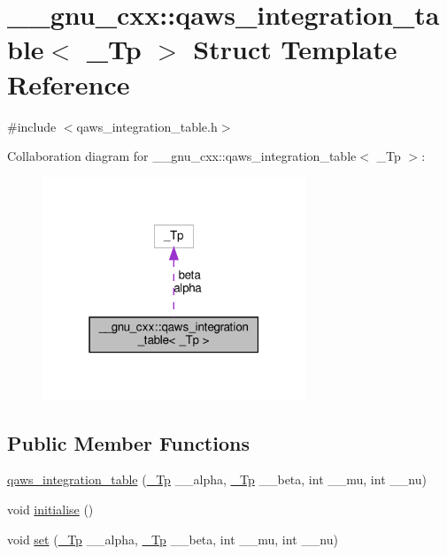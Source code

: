 \hypertarget{struct____gnu__cxx_1_1qaws__integration__table}{}\section{\+\_\+\+\_\+gnu\+\_\+cxx\+:\+:qaws\+\_\+integration\+\_\+table$<$ \+\_\+\+Tp $>$ Struct Template Reference}
\label{struct____gnu__cxx_1_1qaws__integration__table}


{\ttfamily \#include $<$qaws\+\_\+integration\+\_\+table.\+h$>$}



Collaboration diagram for \+\_\+\+\_\+gnu\+\_\+cxx\+:\+:qaws\+\_\+integration\+\_\+table$<$ \+\_\+\+Tp $>$\+:
\nopagebreak
\begin{figure}[H]
\begin{center}
\leavevmode
\includegraphics[width=223pt]{struct____gnu__cxx_1_1qaws__integration__table__coll__graph}
\end{center}
\end{figure}
\subsection*{Public Member Functions}
\begin{DoxyCompactItemize}
\item 
\hyperlink{struct____gnu__cxx_1_1qaws__integration__table_a2fc28f96d3219257c427f50bb6928510}{qaws\+\_\+integration\+\_\+table} (\hyperlink{namespace____gnu__cxx_a3b19a9c800ca194374ef9172290f7d79}{\+\_\+\+Tp} \+\_\+\+\_\+alpha, \hyperlink{namespace____gnu__cxx_a3b19a9c800ca194374ef9172290f7d79}{\+\_\+\+Tp} \+\_\+\+\_\+beta, int \+\_\+\+\_\+mu, int \+\_\+\+\_\+nu)
\item 
void \hyperlink{struct____gnu__cxx_1_1qaws__integration__table_a72d9ce0c313049e00eb9aaf4502161ea}{initialise} ()
\item 
void \hyperlink{struct____gnu__cxx_1_1qaws__integration__table_af94e459877f7602f68ea80d294927f1e}{set} (\hyperlink{namespace____gnu__cxx_a3b19a9c800ca194374ef9172290f7d79}{\+\_\+\+Tp} \+\_\+\+\_\+alpha, \hyperlink{namespace____gnu__cxx_a3b19a9c800ca194374ef9172290f7d79}{\+\_\+\+Tp} \+\_\+\+\_\+beta, int \+\_\+\+\_\+mu, int \+\_\+\+\_\+nu)
\end{DoxyCompactItemize}
